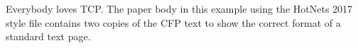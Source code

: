 Everybody loves TCP. The paper body in this example
using the HotNets 2017 style file contains two copies
of the CFP text to show the correct format of a standard text page.
